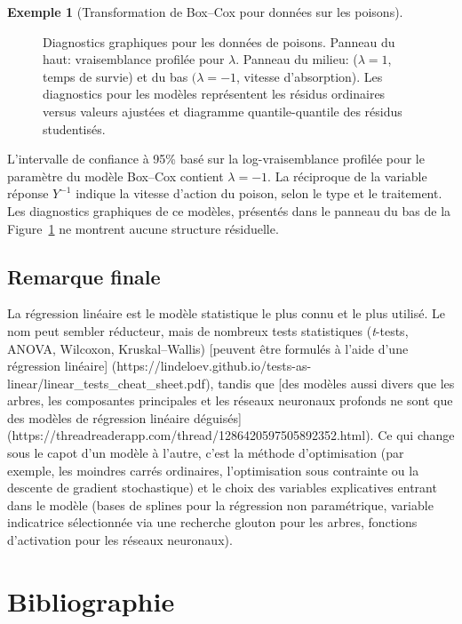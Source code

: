 \documentclass[
  11pt,
  letterpaper,
]{scrbook}
\theoremstyle{definition}
\newtheorem{example}{Exemple}[chapter]
\theoremstyle{plain}
\theoremstyle{definition}
\theoremstyle{plain}
\theoremstyle{remark}
\begin{document}
\begin{example}[Transformation de Box--Cox pour données sur les
poisons]
\begin{figure}[ht!]
{}

\caption{\label{fig-poisonplots}Diagnostics graphiques pour les données
de poisons. Panneau du haut: vraisemblance profilée pour \(\lambda\).
Panneau du milieu: (\(\lambda=1\), temps de survie) et du bas
\((\lambda=-1\), vitesse d'absorption). Les diagnostics pour les modèles
représentent les résidus ordinaires versus valeurs ajustées et diagramme
quantile-quantile des résidus studentisés.}

\end{figure}%

L'intervalle de confiance à 95\% basé sur la log-vraisemblance profilée
pour le paramètre du modèle Box--Cox contient \(\lambda=-1\). La
réciproque de la variable réponse \(Y^{-1}\) indique la vitesse d'action
du poison, selon le type et le traitement. Les diagnostics graphiques de
ce modèles, présentés dans le panneau du bas de la
Figure~\ref{fig-poisonplots} ne montrent aucune structure résiduelle.

\end{example}

\section{Remarque finale}\label{remarque-finale}

La régression linéaire est le modèle statistique le plus connu et le
plus utilisé. Le nom peut sembler réducteur, mais de nombreux tests
statistiques (\emph{t}-tests, ANOVA, Wilcoxon, Kruskal--Wallis)
{[}peuvent être formulés à l'aide d'une régression linéaire{]}
(https://lindeloev.github.io/tests-as-linear/linear\_tests\_cheat\_sheet.pdf),
tandis que {[}des modèles aussi divers que les arbres, les composantes
principales et les réseaux neuronaux profonds ne sont que des modèles de
régression linéaire déguisés{]}
(https://threadreaderapp.com/thread/1286420597505892352.html). Ce qui
change sous le capot d'un modèle à l'autre, c'est la méthode
d'optimisation (par exemple, les moindres carrés ordinaires,
l'optimisation sous contrainte ou la descente de gradient stochastique)
et le choix des variables explicatives entrant dans le modèle (bases de
splines pour la régression non paramétrique, variable indicatrice
sélectionnée via une recherche glouton pour les arbres, fonctions
d'activation pour les réseaux neuronaux).


\chapter*{Bibliographie}\label{bibliographie}
\end{document}
